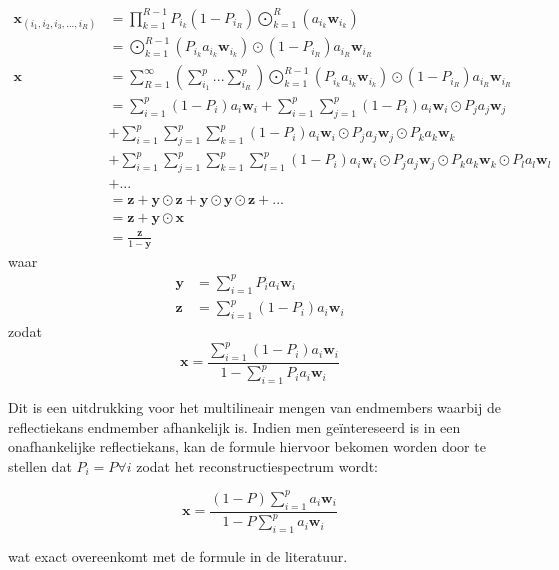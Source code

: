 \documentclass[12pt]{report}
\DeclareMathOperator*{\Odot}{\bigodot}
\begin{document}
\begin{align}
\bm{x}_{(i_1,i_2,i_3,...,i_R)} &= \prod_{k=1}^{R-1}P_{i_k} (1-P_{i_R}) \Odot_{k=1}^R \left(a_{i_k} \bm{w}_{i_k}\right) \\
&= \Odot_{k=1}^{R-1} \left(P_{i_k}a_{i_k} \bm{w}_{i_k}\right) \odot (1-P_{i_R}) a_{i_R} \bm{w}_{i_R} \\
\bm{x} &= \sum_{R=1}^{\infty} \left(\sum_{i_1}^{p} ... \sum_{i_R}^{p}\right) \Odot_{k=1}^{R-1} \left(P_{i_k}a_{i_k} \bm{w}_{i_k}\right) \odot (1-P_{i_R}) a_{i_R} \bm{w}_{i_R} \\
&= \sum_{i=1}^p (1-P_i) a_{i} \bm{w}_{i} + \sum_{i=1}^p \sum_{j=1}^p (1-P_i) a_{i} \bm{w}_{i} \odot P_j a_{j} \bm{w}_{j} \nonumber\\&+ \sum_{i=1}^p \sum_{j=1}^p \sum_{k=1}^p (1-P_i) a_{i} \bm{w}_{i} \odot P_j a_{j} \bm{w}_{j} \odot P_k a_{k} \bm{w}_{k} \nonumber\\&+ \sum_{i=1}^p \sum_{j=1}^p \sum_{k=1}^p  \sum_{l=1}^p (1-P_i) a_{i} \bm{w}_{i} \odot P_j a_{j} \bm{w}_{j} \odot P_k a_{k} \bm{w}_{k} \odot P_l a_{l} \bm{w}_{l} \nonumber \\& + ... \\
&= \bm{z} + \bm{y}\odot\bm{z} + \bm{y}\odot\bm{y}\odot\bm{z} + ... \\
&= \bm{z} + \bm{y}\odot\bm{x} \\
 &= \frac{\bm{z}}{1-\bm{y}}
\end{align}
waar
\begin{align}
\bm{y} &= \sum_{i=1}^p P_i a_{i} \bm{w}_{i} \\
\bm{z} &= \sum_{i=1}^p (1-P_i) a_{i} \bm{w}_{i} 
\end{align}
zodat
\begin{equation}
\bm{x} = \frac{\sum_{i=1}^p (1-P_i) a_{i} \bm{w}_{i}}{1-\sum_{i=1}^p P_i a_{i} \bm{w}_{i}} \label{eq:Pi}
\end{equation}

Dit is een uitdrukking voor het multilineair mengen van endmembers waarbij de reflectiekans endmember afhankelijk is. Indien men ge\"intereseerd is in een onafhankelijke reflectiekans, kan de formule hiervoor bekomen worden door te stellen dat $P_i = P \forall i$ zodat het reconstructiespectrum wordt:

\begin{equation}
\bm{x} = \frac{(1-P) \sum_{i=1}^p a_{i} \bm{w}_{i}}{1-P\sum_{i=1}^p  a_{i} \bm{w}_{i}} \label{eq:P}
\end{equation}

wat exact overeenkomt met de formule in de literatuur\cite{mlinmix}.
\end{document}
